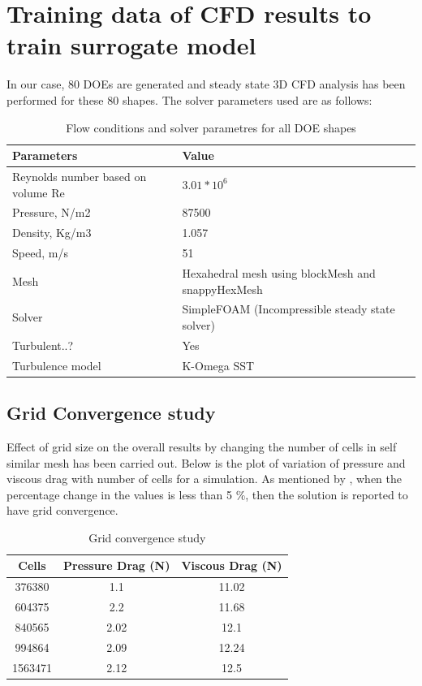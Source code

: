 \chapter{Training data of CFD results to train surrogate model}
In our case, 80 DOEs are generated and steady state 3D CFD analysis has been performed for these 80 shapes. The solver parameters used are as follows:
\begin{table}[H]
	\caption{Flow conditions and solver parametres for all DOE shapes}
	\label{Flow conditions and solver parametres for all DOE shapes}
	\centering
	\begin{tabular}{ll}
		\hline \hline
		Parameters & Value \\ 
		\hline \hline
		Reynolds number based on volume Re & $ 3.01 \ast 10^6 $ \\
		Pressure, N/m2 & 87500 \\
		Density, Kg/m3 & 1.057 \\
		Speed, m/s & 51 \\
		Mesh & Hexahedral mesh using blockMesh and snappyHexMesh \\
		Solver & SimpleFOAM (Incompressible steady state solver) \\
		Turbulent..? & Yes \\
		Turbulence model & K-Omega SST \\
		\hline \hline
	\end{tabular}
\end{table}
\section{Grid Convergence study}

Effect of grid size on the overall results by  changing the number of cells in self similar mesh has been carried out. Below is the plot of variation of pressure and viscous drag with number of cells for a simulation. As mentioned by \cite{Suman2011} , when the percentage change in the values is less than 5 \%, then the solution is reported to have grid convergence.

\begin{table}[H]
	\caption{Grid convergence study}
	\label{Grid convergence table}
	\centering
	\begin{tabular}{ccc}
		\hline \hline
		Cells & Pressure Drag (N) & Viscous Drag (N) \\
		\hline \hline
		376380 & 1.1  & 11.02 \\
		604375  & 2.2  & 11.68 \\
		840565  & 2.02  & 12.1 \\
		994864  & 2.09  & 12.24 \\
		1563471  & 2.12 & 12.5 \\
		\hline \hline
	\end{tabular}
\end{table}

